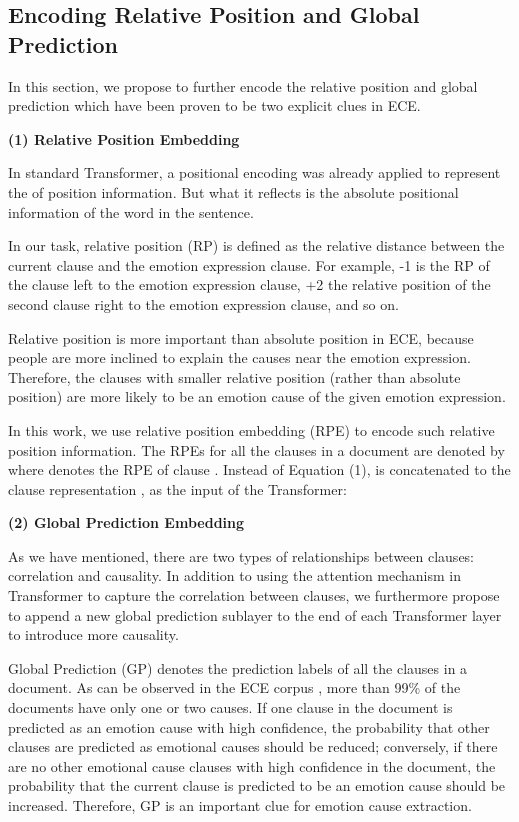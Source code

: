 \documentclass{article}
\begin{document}
\subsection{Encoding Relative Position and Global Prediction}
In this section, we propose to further encode the relative position and global prediction which have been proven to be two explicit clues in ECE. 

\begin{spacing}{1.3}
\noindent\textbf{(1) Relative Position Embedding}
\end{spacing}
\noindent In standard Transformer, a positional encoding was already applied to represent the of position information. But what it reflects is the absolute positional information of the word in the sentence.

In our task, relative position (RP) is defined as the relative distance between the current clause and the emotion expression clause. For example, -1 is the RP of the clause left to the emotion expression clause, +2 the relative position of the second clause right to the emotion expression clause, and so on. 

Relative position is more important than absolute position in ECE, because people are more inclined to explain the causes near the emotion expression. Therefore, the clauses with smaller relative position (rather than absolute position) are more likely to be an emotion cause of the given emotion expression.

In this work, we use relative position embedding (RPE) to encode such relative position information. The RPEs for all the clauses in a document are denoted by  where  denotes the RPE of clause . Instead of Equation (1),  is concatenated to the clause representation , as the input of the Transformer:


\begin{spacing}{1.3}
\noindent\textbf{(2) Global Prediction Embedding}
\end{spacing}
\noindent As we have mentioned, there are two types of relationships between clauses: correlation and causality. In addition to using the attention mechanism in Transformer to capture the correlation between clauses, we furthermore propose to append a new global prediction sublayer to the end of each Transformer layer to introduce more causality.

Global Prediction (GP) denotes the prediction labels of all the clauses in a document. As can be observed in the ECE corpus \cite{gui2016event}, more than 99\% of the documents have only one or two causes. If one clause in the document is predicted as an emotion cause with high confidence, the probability that other clauses are predicted as emotional causes should be reduced; conversely, if there are no other emotional cause clauses with high confidence in the document, the probability that the current clause is predicted to be an emotion cause should be increased. Therefore, GP is an important clue for emotion cause extraction.
\end{document}
